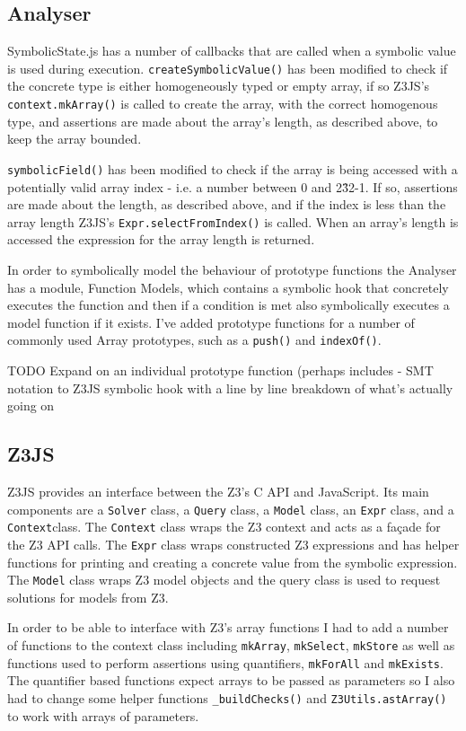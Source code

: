 \documentclass[]{final_report}
\begin{document}
\subsection{Analyser}
SymbolicState.js has a number of callbacks that are called when a symbolic value is used during execution. \lstinline{createSymbolicValue()} has been modified to check if the concrete type is either homogeneously typed or empty array, if so Z3JS’s \lstinline{context.mkArray()} is called to create the array, with the correct homogenous type, and assertions are made about the array’s length, as described above, to keep the array bounded. 

\lstinline{symbolicField()} has been modified to check if the array is being accessed with a potentially valid array index - i.e. a number between 0 and 2\^32-1. If so, assertions are made about the length, as described above, and if the index is less than the array length Z3JS’s \lstinline{Expr.selectFromIndex()} is called. When an array’s length is accessed the expression for the array length is returned.

In order to symbolically model the behaviour of prototype functions the Analyser has a module, Function Models, which contains a symbolic hook that concretely executes the function and then if a condition is met also symbolically executes a model function if it exists. I’ve added prototype functions for a number of commonly used Array prototypes, such as a \lstinline{push()} and \lstinline{indexOf()}.

TODO Expand on an individual prototype function (perhaps includes - SMT notation to Z3JS symbolic hook with a line by line breakdown of what’s actually going on

\subsection{Z3JS}
Z3JS provides an interface between the Z3’s C API and JavaScript. Its main components are a \lstinline{Solver} class, a \lstinline{Query} class, a \lstinline{Model} class, an \lstinline{Expr} class, and a \lstinline{Context}class. The \lstinline{Context} class wraps the Z3 context and acts as a façade for the Z3 API calls. The \lstinline{Expr} class wraps constructed Z3 expressions and has helper functions for printing and creating a concrete value from the symbolic expression. The \lstinline{Model} class wraps Z3 model objects and the query class is used to request solutions for models from Z3.

In order to be able to interface with Z3’s array functions I had to add a number of functions to the context class including \lstinline{mkArray}, \lstinline{mkSelect}, \lstinline{mkStore} as well as functions used to perform assertions using quantifiers, \lstinline{mkForAll} and \lstinline{mkExists}. The quantifier based functions expect arrays to be passed as parameters so I also had to change some helper functions \lstinline{_buildChecks()} and \lstinline{Z3Utils.astArray()} to work with arrays of parameters.
\end{document}
